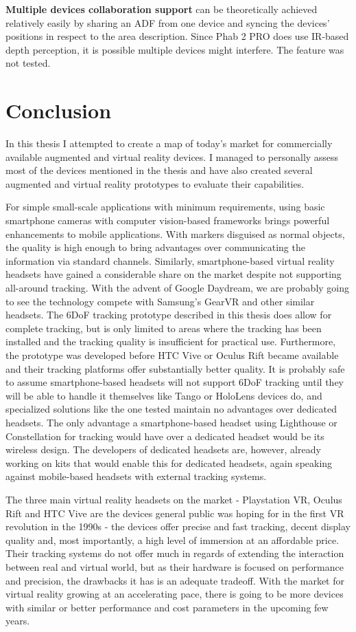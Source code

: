 \documentclass[12pt, a4paper]{article}
\begin{document}
\textbf{Multiple devices collaboration support} can be theoretically achieved relatively easily by sharing an ADF from one device and syncing the devices’ positions in respect to the area description. Since Phab 2 PRO does use IR-based depth perception, it is possible multiple devices might interfere. The feature was not tested.

\section{Conclusion}
In this thesis I attempted to create a map of today’s market for commercially available augmented and virtual reality devices. I managed to personally assess most of the devices mentioned in the thesis and have also created several augmented and virtual reality prototypes to evaluate their capabilities.

For simple small-scale applications with minimum requirements, using basic smartphone cameras with computer vision-based frameworks brings powerful enhancements to mobile applications. With markers disguised as normal objects, the quality is high enough to bring advantages over communicating the information via standard channels. Similarly, smartphone-based virtual reality headsets have gained a considerable share on the market despite not supporting all-around tracking. With the advent of Google Daydream, we are probably going to see the technology compete with Samsung’s GearVR and other similar headsets. The 6DoF tracking prototype described in this thesis does allow for complete tracking, but is only limited to areas where the tracking has been installed and the tracking quality is insufficient for practical use. Furthermore, the prototype was developed before HTC Vive or Oculus Rift became available and their tracking platforms offer substantially better quality. It is probably safe to assume smartphone-based headsets will not support 6DoF tracking until they will be able to handle it themselves like Tango or HoloLens devices do, and specialized solutions like the one tested maintain no advantages over dedicated headsets. The only advantage a smartphone-based headset using Lighthouse or Constellation for tracking would have over a dedicated headset would be its wireless design. The developers of dedicated headsets are, however, already working on kits that would enable this for dedicated headsets, again speaking against mobile-based headsets with external tracking systems.

The three main virtual reality headsets on the market - Playstation VR, Oculus Rift and HTC Vive are the devices general public was hoping for in the first VR revolution in the 1990s - the devices offer precise and fast tracking, decent display quality and, most importantly, a high level of immersion at an affordable price. Their tracking systems do not offer much in regards of extending the interaction between real and virtual world, but as their hardware is focused on performance and precision, the drawbacks it has is an adequate tradeoff. With the market for virtual reality growing at an accelerating pace, there is going to be more devices with similar or better performance and cost parameters in the upcoming few years.
\end{document}
